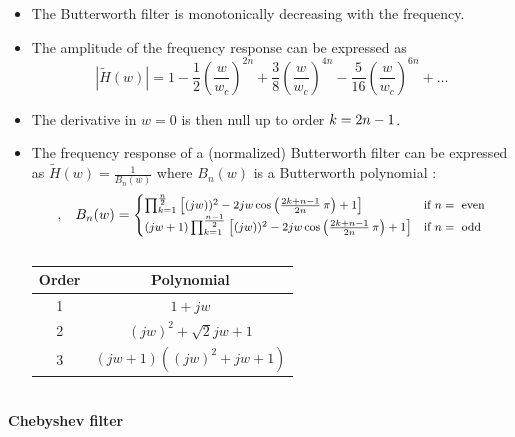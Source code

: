   \begin{itemize}
    \item The Butterworth filter is monotonically decreasing with the frequency.
    \item The amplitude of the frequency response can be expressed as
$$|\tilde H(w)|=1-\frac{1}{2}\left(\frac{w}{w_c}\right)^{2n}+\frac{3}{8}\left(\frac{w}{w_c}\right)^{4n}-\frac{5}{16}\left(\frac{w}{w_c}\right)^{6n}+\dots$$
\item The derivative in $w=0$ is then null up to order 
  $k= 2n-1$.
\item The frequency response of a (normalized) Butterworth filter can be expressed as $\tilde H(w)  =\frac{1}{B_n(w)}$ where  $B_n(w)$ is a Butterworth polynomial :
\begin{equation*}\footnotesize
, \quad B_n(w)= \begin{cases} \prod_{k=1}^{\frac{n}{2}} \left[(jw))^2-2jw\cos\left(\frac{2k+n-1}{2n}\,\pi\right)+1\right] &\mbox{if } n =  \text{ even} \\
  (jw+1)\prod_{k=1}^{\frac{n-1}{2}} \left[(jw))^2-2jw\cos\left(\frac{2k+n-1}{2n}\,\pi\right)+1\right] & \mbox{if } n =  \text{ odd}  \end{cases}
\end{equation*}
\begin{columns}[T]
  \begin{column}
    \begin{tabular}{|c|c|}\hline
      Order & Polynomial \\\hline
      1 & $1+jw$\\
      2 & $(jw)^2+\sqrt{2}jw+1$\\
      3& $(jw+1)((jw)^2+jw+1)$ \\\hline
    \end{tabular}
  \end{column}
\end{columns}
\begin{center}

 
\end{center}
    \end{itemize}

\paragraph{Chebyshev filter}



